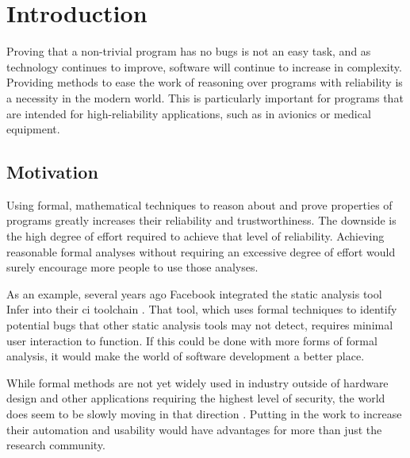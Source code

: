 \chapter{Introduction}
Proving that a non-trivial program has no bugs is not an easy task,
and as technology continues to improve,
software will continue to increase in complexity.
Providing methods to ease the work of reasoning over programs
with reliability is a necessity in the modern world.
This is particularly important for programs
that are intended for high-reliability applications,
such as in avionics or medical equipment.

\section{Motivation}
Using formal, mathematical techniques to reason about and prove properties of programs
greatly increases their reliability and trustworthiness.
The downside is the high degree of effort required to achieve that level of reliability.
Achieving reasonable formal analyses without requiring an excessive degree of effort
would surely encourage more people to use those analyses.

As an example, several years ago Facebook integrated the static analysis tool Infer
into their \ac{ci} toolchain \autocite{calcagno2011infer}.
That tool, which uses formal techniques to identify potential bugs
that other static analysis tools may not detect,
requires minimal user interaction to function.
If this could be done with more forms of formal analysis,
it would make the world of software development a better place.

While formal methods are not yet widely used in industry outside of hardware design
and other applications requiring the highest level of security,
the world does seem to be slowly moving in that direction
\autocite{smackers2019,khazeev2019acceptance}.
Putting in the work to increase their automation and usability
would have advantages for more than just the research community.

